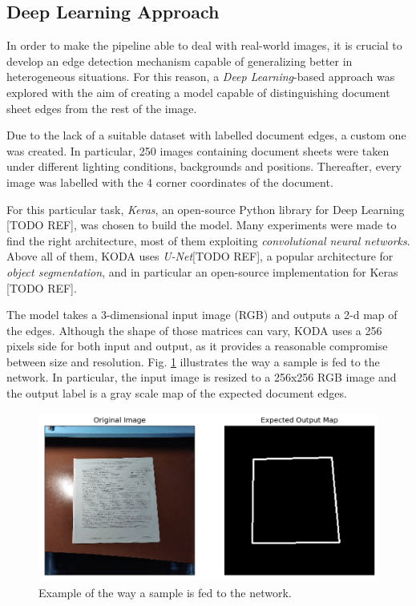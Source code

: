 \documentclass[a4paper]{article}
\begin{document}
\subsection{Deep Learning Approach}

In order to make the pipeline able to deal with real-world images, it is crucial to develop an
edge detection mechanism capable of generalizing better in heterogeneous situations. 
For this reason, a \textit{Deep Learning}-based approach was explored with the aim of creating a model
capable of distinguishing document sheet edges from the rest of the image.

Due to the lack of a suitable dataset with labelled document edges, a custom one was created.
In particular, 250 images containing document sheets were taken under different lighting conditions, 
backgrounds and positions. Thereafter, every image was labelled with the 4 corner coordinates of the document.

For this particular task, \textit{Keras}, an open-source Python library for Deep Learning [TODO REF], was chosen to build the model. Many experiments were made to find the right architecture, most of them 
exploiting \textit{convolutional neural networks}. Above all of them, KODA uses \textit{U-Net}[TODO REF], a popular architecture for \textit{object segmentation}, and in particular an open-source implementation for Keras [TODO REF].

The model takes a 3-dimensional input image (RGB) and outputs a 2-d map of the edges. Although the shape
of those matrices can vary, KODA uses a 256 pixels side for both input and output, as it provides a reasonable compromise between size and resolution. Fig. \ref{fig:label_edge} illustrates the way a
sample is fed to the network. In particular, the input image is resized to a 256x256 RGB image and the
output label is a gray scale map of the expected document edges.

\begin{figure}[htb!]
	\includegraphics[width=\linewidth]{label_edge.png}
	\caption{Example of the way a sample is fed to the network.}
	\label{fig:label_edge}
\end{figure}
\end{document}
